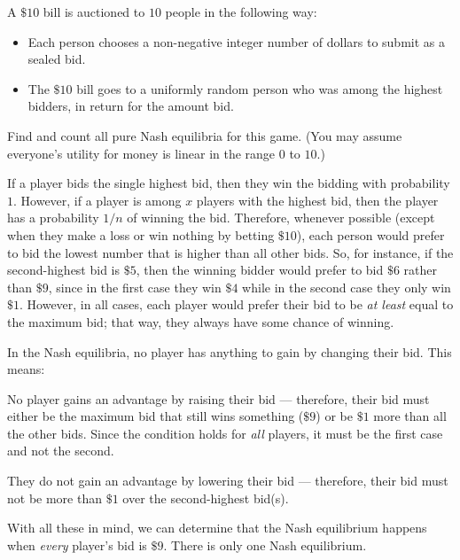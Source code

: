 \documentclass[11pt, reqno]{amsart}
\begin{document}
\newpage
\begin{problem}[16]

  \step
  A $\$10$ bill is auctioned to $10$ people in the following way:
  \begin{itemize}
    \item Each person chooses a non-negative integer number of dollars to submit as a sealed bid.
    \item The $\$10$ bill goes to a uniformly random person who was among the highest bidders,
    in return for the amount bid.
  \end{itemize}
  Find and count all pure Nash equilibria for this game.
  (You may assume everyone's utility for money is linear in the range $0$ to $10$.)

  \step
  If a player bids the single highest bid, then they win the bidding with probability $1$.
  However, if a player is among $x$ players with the highest bid, then the player has a probability
  $1/n$ of winning the bid.
  Therefore, whenever possible (except when they make a loss or win nothing by betting $\$10$),
  each person would prefer to bid the lowest number that is higher than all other bids.
  So, for instance, if the second-highest bid is $\$5$,
  then the winning bidder would prefer to bid $\$6$ rather than $\$9$, since in the first
  case they win $\$4$ while in the second case they only win $\$1$.
  However, in all cases, each player would prefer their bid to be \emph{at least}
  equal to the maximum bid; that way, they always have some chance of winning.

  \step
  In the Nash equilibria, no player has anything to gain by changing their bid.
  This means:
  \begin{enumroman}
    \item No player gains an advantage by raising their bid --- therefore, their bid
      must either be the maximum bid that still wins something ($\$9$) or be $\$1$
      more than all the other bids. Since the condition holds for \emph{all} players,
      it must be the first case and not the second.
    \item They do not gain an advantage by lowering their bid --- therefore, their bid
      must not be more than $\$1$ over the second-highest bid(s).
  \end{enumroman}

  With all these in mind, we can determine that the Nash equilibrium happens when
  \emph{every} player's bid is $\$9$. There is only one Nash equilibrium.
\end{problem}
\end{document}
